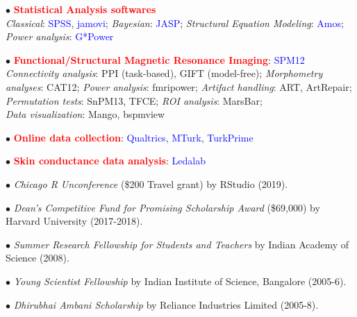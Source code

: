\documentclass[10pt]{article}
\begin{document}
	

	$\bullet$ \textcolor{red}{\textbf{Statistical Analysis softwares}}\\
	\hspace*{0.1in}\textit{Classical}: \textcolor{blue}{SPSS}, \textcolor{blue}{jamovi}; \textit{Bayesian}: \textcolor{blue}{JASP}; \textit{Structural Equation Modeling}: \textcolor{blue}{Amos}; \textit{Power analysis}: \textcolor{blue}{G*Power}
	\miniskip
	
	$\bullet$ \textcolor{red}{\textbf{Functional/Structural Magnetic Resonance Imaging}}: \textcolor{blue}{SPM12}\\
	\hspace*{0.1in}\textit{Connectivity analysis}: PPI (task-based), GIFT (model-free); \textit{Morphometry analyses}: CAT12; \textit{Power analysis}: \hspace*{0.1in}fmripower; \textit{Artifact handling}: ART, ArtRepair; \textit{Permutation tests}: SnPM13, TFCE; \textit{ROI analysis}: MarsBar;\\ 
	\hspace*{0.1in}\textit{Data visualization}: Mango, bspmview
	\miniskip
	
	$\bullet$ \textcolor{red}{\textbf{Online data collection}}: \textcolor{blue}{Qualtrics}, \textcolor{blue}{MTurk}, \textcolor{blue}{TurkPrime}\\
	\miniskip
	
	$\bullet$ \textcolor{red}{\textbf{Skin conductance data analysis}}: \textcolor{blue}{Ledalab}

	
	$\bullet$ \textit{Chicago R Unconference} (\$200 Travel grant) by RStudio (2019).\\
	\miniskip		
	
	$\bullet$ \textit{Dean's Competitive Fund for Promising Scholarship Award} (\$69,000) by Harvard University (2017-2018).\\
	\miniskip	
	
	$\bullet$ {\it Summer Research Fellowship for Students and Teachers} by Indian Academy of Science (2008).\\
	\miniskip
	
	$\bullet$ {\it Young Scientist Fellowship} by Indian Institute of Science, Bangalore (2005-6).\\
	\miniskip
	
	$\bullet$ {\it Dhirubhai Ambani Scholarship} by Reliance Industries Limited (2005-8). 	
	
	
\end{document}
